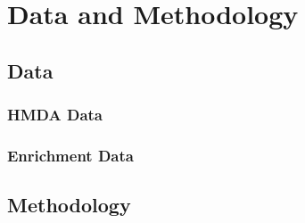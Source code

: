 \chapter{Data and Methodology}\label{ch:Data_and_Methodology}



\section{Data}\label{sec:Data}



\subsection{HMDA Data}\label{subsec:HMDA_Data}



\subsection{Enrichment Data}\label{subsec:Enrichment_Data}


\section{Methodology}\label{sec:Methodology}